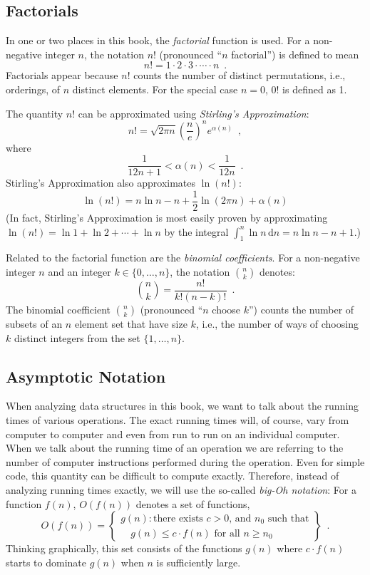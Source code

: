 \subsection{Factorials}

In one or two places in this book, the \emph{factorial} function is used.  For a non-negative integer $n$, the notation $n!$ (pronounced ``$n$ factorial'') is defined to mean 
\[
   n! = 1\cdot2\cdot3\cdot\cdots\cdot n \enspace .
\]
Factorials appear because $n!$ counts the number of distinct permutations, i.e., orderings, of $n$ distinct elements.   For the special case $n=0$, $0!$ is defined as 1. 

 The quantity $n!$ can be approximated using \emph{Stirling's Approximation}:
\[
	n! 
   = \sqrt{2\pi n}\left(\frac{n}{e}\right)^{n}e^{\alpha(n)} \enspace ,
\]
where
\[  
   \frac{1}{12n+1} <  \alpha(n) < \frac{1}{12n}  \enspace .
\]
Stirling's Approximation also approximates $\ln(n!)$:
\[
   \ln(n!) = n\ln n - n + \frac{1}{2}\ln(2\pi n) + \alpha(n)
\]
(In fact, Stirling's Approximation is most easily proven by approximating
$\ln(n!)=\ln 1 + \ln 2  + \cdots + \ln n$ by the integral
$\int_1^n \ln n\,\mathrm{d}n = n\ln n - n +1$.)

Related to the factorial function are the \emph{binomial coefficients}.  For a non-negative integer $n$ and an integer $k\in\{0,\ldots,n\}$, the notation $\binom{n}{k}$ denotes:
\[
   \binom{n}{k} = \frac{n!}{k!(n-k)!} \enspace .
\]
The binomial coefficient $\binom{n}{k}$ (pronounced ``$n$ choose $k$'') counts the number of subsets of an $n$ element set that have size $k$, i.e., the number of ways of choosing $k$ distinct integers from the set $\{1,\ldots,n\}$.

\subsection{Asymptotic Notation}

   When analyzing data structures in this book, we want to talk about the running times of various operations.  The exact running times will, of course, vary from computer to computer and even from run to run on an individual computer.  When we talk about the running time of an operation we are referring to the number of computer instructions performed during the operation.  Even for simple code, this quantity can be difficult to compute exactly.  Therefore, instead of analyzing running times exactly, we will use the so-called \emph{big-Oh notation}: For a function $f(n)$, $O(f(n))$ denotes a set of functions,
\[
   O(f(n)) = \left\{
     \begin{array}{l}
       g(n):\mbox{there exists $c>0$, and $n_0$ such that} \\
             \quad\mbox{$g(n) \le c\cdot f(n)$ for all $n\ge n_0$}   
     \end{array} \right\} \enspace .
\]
Thinking graphically, this set consists of the functions $g(n)$ where $c\cdot f(n)$ starts to dominate $g(n)$ when $n$ is sufficiently large.

